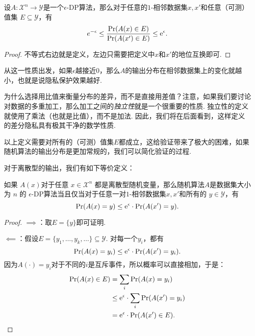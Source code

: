 \begin{proposition}
    设$A:\mathcal X^n\to\mathcal Y$是一个$\epsilon$-DP算法，那么对于任意的$1$-相邻数据集$x, x'$和任意（可测）值集 $E \subseteq \mathcal Y$，有
    \[
    e^{-\epsilon}\leq \frac{\Pr(A(x)\in E)}{\Pr(A(x')\in E)}\leq \mathrm{e}^{\epsilon}.
    \]
\end{proposition}
\begin{proof}
    不等式右边就是定义，左边只需要把定义中$x$和$x'$的地位互换即可.
\end{proof}

从这一性质出发，如果$\epsilon$越接近$0$，那么$A$的输出分布在相邻数据集上的变化就越小，也就是说隐私保护效果越好.

\begin{remark}
    为什么选择用比值来衡量分布的差异，而不是直接用差值？注意，如果我们要讨论对数据的多重加工，那么加工之间的\textit{独立性}就是一个很重要的性质. 独立性的定义就使用了乘法（也就是比值），而不是加法. 因此，我们将在后面看到，这样定义的差分隐私具有极其干净的数学性质. 
\end{remark}

以上定义需要对所有的（可测）值集$E$都成立，这给验证带来了极大的困难，如果随机算法的输出分布是更加常规的，我们可以简化验证的过程. 

对于离散型的输出，我们有如下等价定义：
\begin{proposition}\label{prop:discrete-dp}
    如果 $A(x)$对于任意 $x \in \mathcal X^n$ 都是离散型随机变量，那么随机算法$A$是数据集大小为 $n$ 的 $\epsilon$-DP算法当且仅当对于任意一对$1$-相邻数据集$x, x'$和所有的 $y \in \mathcal Y$，有
    \[
    \Pr(A(x) = y) \leq \mathrm{e}^{\epsilon} \cdot \Pr(A(x') = y).
    \]
\end{proposition}
\begin{proof}
$\implies$：取$E = \{y\}$即可证明.

$\impliedby$：假设$E=\{y_1,\dots,y_k,\dots\}\subseteq\mathcal Y$. 对每一个$y_i$，都有
    \[
    \Pr(A(x) = y_i) \leq \mathrm{e}^{\epsilon} \cdot \Pr(A(x') = y_i).
    \]
因为$A(\cdot)=y_i$对于不同的$i$是互斥事件，所以概率可以直接相加，于是：
    \begin{align*}
    \Pr(A(x) \in E) &= \sum_i \Pr(A(x) = y_i) \\
    &\leq \mathrm{e}^{\epsilon} \cdot \sum_i\Pr(A(x') = y_i) \\
    &= \mathrm{e}^{\epsilon} \cdot \Pr(A(x') \in E).
    \end{align*}
\end{proof}

